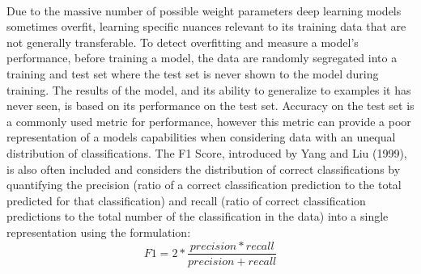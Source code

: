 \documentclass[11pt]{article}
\begin{document}
\newline
\\
Due to the massive number of possible weight parameters deep learning models sometimes overfit, learning specific nuances relevant to its training data that are not generally transferable. To detect overfitting and measure a model's performance, before training a model, the data are randomly segregated into a training and test set where the test set is never shown to the model during training. The results of the model, and its ability to generalize to examples it has never seen, is based on its performance on the test set. Accuracy on the test set is a commonly used metric for performance, however this metric can provide a poor representation of a models capabilities when considering data with an unequal distribution of classifications. The F1 Score, introduced by Yang and Liu (1999), is also often included and considers the distribution of correct classifications by quantifying the precision (ratio of a correct classification prediction to the total predicted for that classification) and recall (ratio of correct classification predictions to the total number of the classification in the data) into a single representation using the formulation: \cite{yang1999re} $$F1=2*\frac{precision*recall}{precision+recall}$$
\newline
\\
\end{document}
